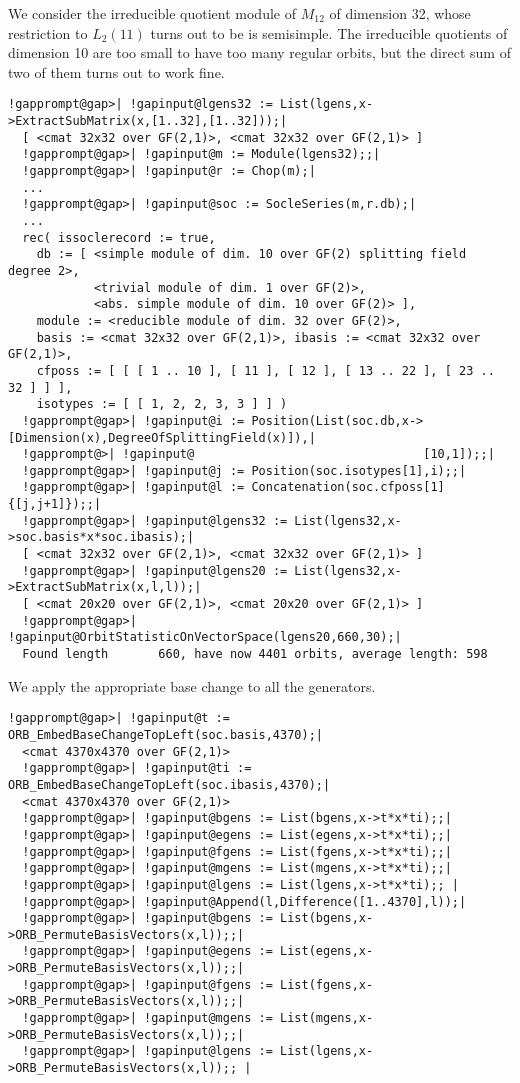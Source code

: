 \documentclass[a4paper,11pt]{report}
\begin{document}
{{ We consider the irreducible quotient module of $M_{{12}}$ of dimension 32, whose restriction to $L_2(11)$ turns out to be is semisimple. The irreducible quotients of dimension 10 are
too small to have too many regular orbits, but the direct sum of two of them
turns out to work fine. 
\begin{Verbatim}[commandchars=!@|,fontsize=\small,frame=single,label=Example]
  !gapprompt@gap>| !gapinput@lgens32 := List(lgens,x->ExtractSubMatrix(x,[1..32],[1..32]));|
  [ <cmat 32x32 over GF(2,1)>, <cmat 32x32 over GF(2,1)> ]
  !gapprompt@gap>| !gapinput@m := Module(lgens32);;|
  !gapprompt@gap>| !gapinput@r := Chop(m);|
  ...
  !gapprompt@gap>| !gapinput@soc := SocleSeries(m,r.db);|
  ...
  rec( issoclerecord := true,
    db := [ <simple module of dim. 10 over GF(2) splitting field degree 2>,
            <trivial module of dim. 1 over GF(2)>,
            <abs. simple module of dim. 10 over GF(2)> ],
    module := <reducible module of dim. 32 over GF(2)>,
    basis := <cmat 32x32 over GF(2,1)>, ibasis := <cmat 32x32 over GF(2,1)>,
    cfposs := [ [ [ 1 .. 10 ], [ 11 ], [ 12 ], [ 13 .. 22 ], [ 23 .. 32 ] ] ],
    isotypes := [ [ 1, 2, 2, 3, 3 ] ] )
  !gapprompt@gap>| !gapinput@i := Position(List(soc.db,x->[Dimension(x),DegreeOfSplittingField(x)]),|
  !gapprompt@>| !gapinput@                                [10,1]);;|
  !gapprompt@gap>| !gapinput@j := Position(soc.isotypes[1],i);;|
  !gapprompt@gap>| !gapinput@l := Concatenation(soc.cfposs[1]{[j,j+1]});;|
  !gapprompt@gap>| !gapinput@lgens32 := List(lgens32,x->soc.basis*x*soc.ibasis);|
  [ <cmat 32x32 over GF(2,1)>, <cmat 32x32 over GF(2,1)> ]
  !gapprompt@gap>| !gapinput@lgens20 := List(lgens32,x->ExtractSubMatrix(x,l,l));|
  [ <cmat 20x20 over GF(2,1)>, <cmat 20x20 over GF(2,1)> ]
  !gapprompt@gap>| !gapinput@OrbitStatisticOnVectorSpace(lgens20,660,30);|
  Found length       660, have now 4401 orbits, average length: 598 
\end{Verbatim}
 

 We apply the appropriate base change to all the generators. 
\begin{Verbatim}[commandchars=!@|,fontsize=\small,frame=single,label=Example]
  !gapprompt@gap>| !gapinput@t := ORB_EmbedBaseChangeTopLeft(soc.basis,4370);|
  <cmat 4370x4370 over GF(2,1)>
  !gapprompt@gap>| !gapinput@ti := ORB_EmbedBaseChangeTopLeft(soc.ibasis,4370);|
  <cmat 4370x4370 over GF(2,1)>
  !gapprompt@gap>| !gapinput@bgens := List(bgens,x->t*x*ti);;|
  !gapprompt@gap>| !gapinput@egens := List(egens,x->t*x*ti);;|
  !gapprompt@gap>| !gapinput@fgens := List(fgens,x->t*x*ti);;|
  !gapprompt@gap>| !gapinput@mgens := List(mgens,x->t*x*ti);;|
  !gapprompt@gap>| !gapinput@lgens := List(lgens,x->t*x*ti);; |
  !gapprompt@gap>| !gapinput@Append(l,Difference([1..4370],l));|
  !gapprompt@gap>| !gapinput@bgens := List(bgens,x->ORB_PermuteBasisVectors(x,l));;|
  !gapprompt@gap>| !gapinput@egens := List(egens,x->ORB_PermuteBasisVectors(x,l));;|
  !gapprompt@gap>| !gapinput@fgens := List(fgens,x->ORB_PermuteBasisVectors(x,l));;|
  !gapprompt@gap>| !gapinput@mgens := List(mgens,x->ORB_PermuteBasisVectors(x,l));;|
  !gapprompt@gap>| !gapinput@lgens := List(lgens,x->ORB_PermuteBasisVectors(x,l));; |
\end{Verbatim}
 

}}
\end{document}
